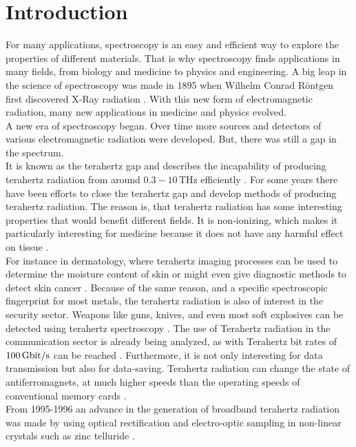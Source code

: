 \chapter{Introduction}
For many applications, spectroscopy is an easy and efficient way to explore the properties of different materials.
That is why spectroscopy finds applications in many fields, from biology and medicine to physics and engineering.
A big leap in the science of spectroscopy was made in 1895 when Wilhelm Conrad Röntgen first discovered X-Ray radiation \cite{roentgen}.
With this new form of electromagnetic radiation, many new applications in medicine and physics evolved.
\\
A new era of spectroscopy began.
Over time more sources and detectors of various electromagnetic radiation were developed.
But, there was still a gap in the spectrum.
\\
It is known as the terahertz gap and describes the incapability of producing terahertz radiation from around $0.3-10\,\si{\tera\hertz}$ efficiently \cite{THzgap_applications}.
For some years there have been efforts to close the terahertz gap and develop methods of producing terahertz radiation.
The reason is, that terahertz radiation has some interesting properties that would benefit different fields.
It is non-ionizing, which makes it particularly interesting for medicine because it does not have any harmful effect on tissue \cite{THzgap_applications}.
\\
For instance in dermatology, where terahertz imaging processes can be used to determine the moisture content of skin or might even give diagnostic methods to detect skin cancer \cite{terahertz_dermatology}. 
Because of the same reason, and a specific spectroscopic fingerprint for most metals, the terahertz radiation is also of interest in the security sector.
Weapons like guns, knives, and even most soft explosives can be detected using terahertz spectroscopy \cite{THzgap_applications} \cite{thz_explosive_detec}.
The use of Terahertz radiation in the communication sector is already being analyzed, as with Terahertz bit rates of $\SI{100}{\giga\bit\per\second}$ can be reached \cite{communication}.
Furthermore, it is not only interesting for data transmission but also for data-saving.
Terahertz radiation can change the state of antiferromagnets, at much higher speeds than the operating speeds of conventional memory cards \cite{datasaving}.
\\
From 1995-1996 an advance in the generation of broadband terahertz radiation was made by using optical rectification and electro-optic sampling in non-linear crystals such as zinc telluride \cite{first_eos_wu_zhang}\cite{ZnTe_Nahata_Weling_1996}.
